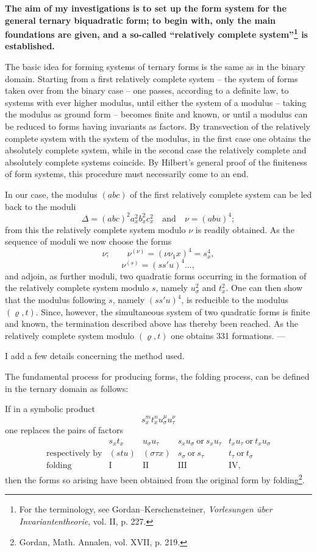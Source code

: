 \documentclass[11pt]{article}
\begin{document}
\textbf{The aim of my investigations is to set up the form system for the general ternary biquadratic form; to begin with, only the main foundations are given, and a so-called ``relatively complete system''\footnote{For the terminology, see Gordan--Kerschensteiner, \emph{Vorlesungen über Invariantentheorie}, vol. II, p. 227.} is established.}

The basic idea for forming systems of ternary forms is the same as in the binary domain. Starting from a first relatively complete system -- the system of forms taken over from the binary case -- one passes, according to a definite law, to systems with ever higher modulus, until either the system of a modulus -- taking the modulus as ground form -- becomes finite and known, or until a modulus can be reduced to forms having invariants as factors. By transvection of the relatively complete system with the system of the modulus, in the first case one obtains the absolutely complete system, while in the second case the relatively complete and absolutely complete systems coincide. By Hilbert's general proof of the finiteness of form systems, this procedure must necessarily come to an end.

In our case, the modulus $(abc)$ of the first relatively complete system can be led back to the moduli
\[
\Delta=(abc)^2a_x^2b_x^2c_x^2\quad\text{and}\quad \nu=(abu)^4;
\]
from this the relatively complete system modulo $\nu$ is readily obtained. As the sequence of moduli we now choose the forms
\[
\nu;\qquad \nu^{(\nu)}=(\nu\nu_1x)^4=s_x^4,
\]
\[
\nu^{(s)}=(ss'u)^4\ldots,
\]
and adjoin, as further moduli, two quadratic forms occurring in the formation of the relatively complete system modulo $s$, namely $u_\sigma^2$ and $t_x^2$. One can then show that the modulus following $s$, namely $(ss'u)^4$, is reducible to the modulus $(\varrho,t)$. Since, however, the simultaneous system of two quadratic forms is finite and known, the termination described above has thereby been reached. As the relatively complete system modulo $(\varrho,t)$ one obtains 331 formations. ---

I add a few details concerning the method used.

The fundamental process for producing forms, the folding process, can be defined in the ternary domain as follows:

If in a symbolic product
\[
s_x^m t_x^n u_\sigma^\mu u_\tau^\nu
\]
one replaces the pairs of factors
\[
\begin{array}{c|c|c|c|c}
 & s_xt_x & u_\sigma u_\tau & s_xu_\sigma\ \text{or}\ s_xu_\tau & t_xu_\tau\ \text{or}\ t_xu_\sigma\\
\text{respectively by} & (stu) & (\sigma\tau x) & s_\sigma\ \text{or}\ s_\tau & t_\tau\ \text{or}\ t_\sigma\\
\text{folding} & \mathrm{I} & \mathrm{II} & \mathrm{III} & \mathrm{IV},
\end{array}
\]
then the forms so arising have been obtained from the original form by folding\footnote{Gordan, Math. Annalen, vol. XVII, p. 219.}.
\end{document}
